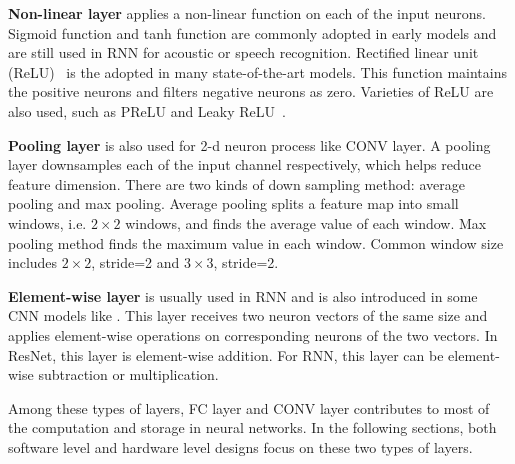 {\bf{Non-linear layer}} applies a non-linear function on each of the input neurons. Sigmoid function and tanh function are commonly adopted in early models and are still used in RNN for acoustic or speech recognition. Rectified linear unit (ReLU)~\cite{krizhevsky2012imagenet} is the adopted in many state-of-the-art models. This function maintains the positive neurons and filters negative neurons as zero. Varieties of ReLU are also used, such as PReLU and Leaky ReLU~\cite{xu2015empirical}.

{\bf{Pooling layer}} is also used for 2-d neuron process like CONV layer. A pooling layer downsamples each of the input channel respectively, which helps reduce feature dimension. There are two kinds of down sampling method: average pooling and max pooling. Average pooling splits a feature map into small windows, i.e. $2\times2$ windows, and finds the average value of each window. Max pooling method finds the maximum value in each window. Common window size includes $2\times2$, stride=2 and $3\times3$, stride=2.

{\bf{Element-wise layer}} is usually used in RNN and is also introduced in some CNN models like \cite{he2016deep}. This layer receives two neuron vectors of the same size and applies element-wise operations on corresponding neurons of the two vectors. In ResNet, this layer is element-wise addition. For RNN, this layer can be element-wise subtraction or multiplication.

Among these types of layers, FC layer and CONV layer contributes to most of the computation and storage in neural networks. In the following sections, both software level and hardware level designs focus on these two types of layers.